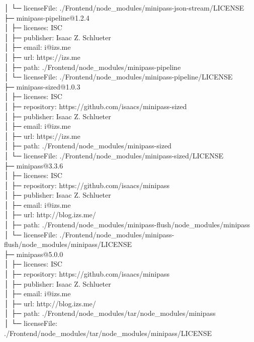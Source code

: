 │  └─ licenseFile: ./Frontend/node\_modules/minipass-json-stream/LICENSE\\
├─ minipass-pipeline@1.2.4\\
│  ├─ licenses: ISC\\
│  ├─ publisher: Isaac Z. Schlueter\\
│  ├─ email: i@izs.me\\
│  ├─ url: https://izs.me\\
│  ├─ path: ./Frontend/node\_modules/minipass-pipeline\\
│  └─ licenseFile: ./Frontend/node\_modules/minipass-pipeline/LICENSE\\
├─ minipass-sized@1.0.3\\
│  ├─ licenses: ISC\\
│  ├─ repository: https://github.com/isaacs/minipass-sized\\
│  ├─ publisher: Isaac Z. Schlueter\\
│  ├─ email: i@izs.me\\
│  ├─ url: https://izs.me\\
│  ├─ path: ./Frontend/node\_modules/minipass-sized\\
│  └─ licenseFile: ./Frontend/node\_modules/minipass-sized/LICENSE\\
├─ minipass@3.3.6\\
│  ├─ licenses: ISC\\
│  ├─ repository: https://github.com/isaacs/minipass\\
│  ├─ publisher: Isaac Z. Schlueter\\
│  ├─ email: i@izs.me\\
│  ├─ url: http://blog.izs.me/\\
│  ├─ path: ./Frontend/node\_modules/minipass-flush/node\_modules/minipass\\
│  └─ licenseFile: ./Frontend/node\_modules/minipass-flush/node\_modules/minipass/LICENSE\\
├─ minipass@5.0.0\\
│  ├─ licenses: ISC\\
│  ├─ repository: https://github.com/isaacs/minipass\\
│  ├─ publisher: Isaac Z. Schlueter\\
│  ├─ email: i@izs.me\\
│  ├─ url: http://blog.izs.me/\\
│  ├─ path: ./Frontend/node\_modules/tar/node\_modules/minipass\\
│  └─ licenseFile: ./Frontend/node\_modules/tar/node\_modules/minipass/LICENSE\\
